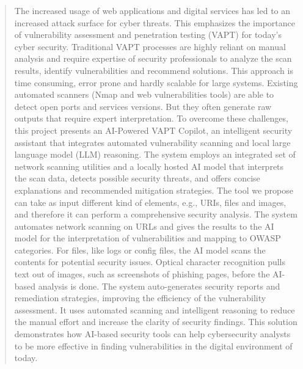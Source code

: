 \documentclass[runningheads]{llncs}
\begin{document}
\begin{abstract}
The increased usage of web applications and digital services has led to an increased attack surface for cyber threats. This emphasizes the importance of vulnerability assessment and penetration testing (VAPT) for today’s cyber security. Traditional VAPT processes are highly reliant on manual analysis and require expertise of security professionals to analyze the scan results, identify vulnerabilities and recommend solutions. This approach is time consuming, error prone and hardly scalable for large systems. Existing automated scanners (Nmap and web vulnerabilities tools) are able to detect open ports and services versions. But they often generate raw outputs that require expert interpretation. To overcome these challenges, this project presents an AI-Powered VAPT Copilot, an intelligent security assistant that integrates automated vulnerability scanning and local large language model (LLM) reasoning. The system employs an integrated set of network scanning utilities and a locally hosted AI model that interprets the scan data, detects possible security threats, and offers concise explanations and recommended mitigation strategies. The tool we propose can take as input different kind of elements, e.g., URIs, files and images, and therefore it can perform a comprehensive security analysis. The system automates network scanning on URLs and gives the results to the AI model for the interpretation of vulnerabilities and mapping to OWASP categories. For files, like logs or config files, the AI model scans the contents for potential security issues. Optical character recognition pulls text out of images, such as screenshots of phishing pages, before the AI-based analysis is done. The system auto-generates security reports and remediation strategies, improving the efficiency of the vulnerability assessment. It uses automated scanning and intelligent reasoning to reduce the manual effort and increase the clarity of security findings. This solution demonstrates how AI-based security tools can help cybersecurity analysts to be more effective in finding vulnerabilities in the digital environment of today.

\end{abstract}

\end{document}
